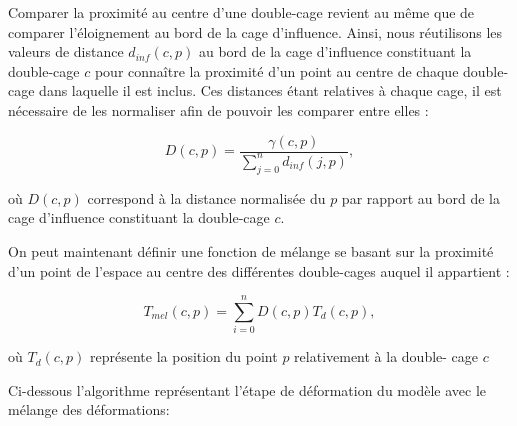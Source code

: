 Comparer la proximité au centre d'une double-cage revient au même que de
comparer l'éloignement au bord de la cage d'influence. Ainsi, nous réutilisons
les valeurs de distance $d_{inf}(c, p)$ au bord de la cage d'influence
constituant la double-cage $c$ pour connaître la proximité d'un point au
centre de chaque double-cage dans laquelle il est inclus. Ces distances étant
relatives à chaque cage, il est nécessaire de les normaliser afin de pouvoir
les comparer entre elles :

\begin{displaymath}
  D(c, p) = \frac{\gamma(c, p)}{\sum_{j=0}^n d_{inf}(j, p)}, 
\end{displaymath}

où $D(c, p)$ correspond à la distance normalisée du $p$ par rapport au
bord de la cage d'influence constituant la double-cage $c$.

On peut maintenant définir une fonction de mélange se basant sur la proximité
d'un point de l'espace au centre des différentes double-cages auquel il
appartient :

\begin{displaymath}
  T_{mel}(c, p) = \sum_{i=0}^n D(c, p) T_{d}(c, p),
\end{displaymath}

où $T_{d}(c, p)$ représente la position du point $p$ relativement à la double-
cage $c$

Ci-dessous l'algorithme représentant l'étape de déformation du modèle avec le
mélange des déformations: \\

 \\

